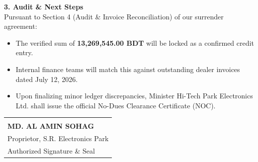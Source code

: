 \documentclass[11pt, a4paper]{article}
\begin{document}
\vspace{10pt}

\textbf{3. Audit \& Next Steps}\\[4pt]
Pursuant to Section 4 (Audit \& Invoice Reconciliation) of our surrender agreement:
\begin{itemize}
    \item The verified sum of \textbf{13,269,545.00 BDT} will be locked as a confirmed credit entry.
    \item Internal finance teams will match this against outstanding dealer invoices dated July 12, 2026.
    \item Upon finalizing minor ledger discrepancies, Minister Hi-Tech Park Electronics Ltd. shall issue the official No-Dues Clearance Certificate (NOC).
\end{itemize}

\vspace{40pt}

\begin{leftline}
\begin{tabular}{@{}p{8cm}@{}}
    \dotfill \\
    \textbf{MD. AL AMIN SOHAG} \\
    Proprietor, S.R. Electronics Park \\
    Authorized Signature \& Seal
\end{tabular}
\end{leftline}
\end{document}
